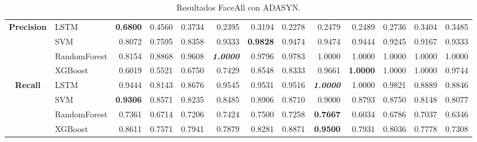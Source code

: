 \begin{table}[H]
\begin{adjustbox}{max width=14cm}
\begin{tabular}{|c|l|r|r|r|r|r|r|r|r|r|r|r|}
			\hline
			\textbf{Precision} & LSTM &  \textbf{0.6800} &  0.4560 &  0.3734 &  0.2395 &  0.3194 &  0.2278 &  0.2479 &  0.2489 &  0.2736 &  0.3404 &  0.3485 \\
			& SVM &  0.8072 &  0.7595 &  0.8358 &  0.9333 &  \textbf{0.9828} &  0.9474 &  0.9474 &  0.9444 &  0.9245 &  0.9167 &  0.9333 \\
			& RandomForest &  0.8154 &  0.8868 &  0.9608 &  \textit{\textbf{1.0000}} &  0.9796 &  0.9783 &  1.0000 &  1.0000 &  1.0000 &  1.0000 &  1.0000 \\
			& XGBoost &  0.6019 &  0.5521 &  0.6750 &  0.7429 &  0.8548 &  0.8333 &  0.9661 &  \textbf{1.0000} &  1.0000 &  1.0000 &  0.9744 \\
			\hline
			\textbf{Recall} & LSTM &  0.9444 &  0.8143 &  0.8676 &  0.9545 &  0.9531 &  0.9516 &  \textit{\textbf{1.0000}} &  1.0000 &  0.9821 &  0.8889 &  0.8846 \\
			& SVM &  \textbf{0.9306} &  0.8571 &  0.8235 &  0.8485 &  0.8906 &  0.8710 &  0.9000 &  0.8793 &  0.8750 &  0.8148 &  0.8077 \\
			& RandomForest &  0.7361 &  0.6714 &  0.7206 &  0.7424 &  0.7500 &  0.7258 &  \textbf{0.7667} &  0.6034 &  0.6786 &  0.7037 &  0.6346 \\
			& XGBoost &  0.8611 &  0.7571 &  0.7941 &  0.7879 &  0.8281 &  0.8871 &  \textbf{0.9500} &  0.7931 &  0.8036 &  0.7778 &  0.7308 \\
			\hline
		\end{tabular}
	\end{adjustbox}	
	\caption{Resultados FaceAll con ADASYN.}
	\label{tab:faceAllADASYN}
\end{table}

